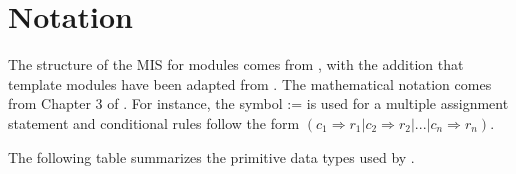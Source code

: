\documentclass[12pt, titlepage]{article}
\begin{document}
\section{Notation}


The structure of the MIS for modules comes from \citet{HoffmanAndStrooper1995},
with the addition that template modules have been adapted from
\cite{GhezziEtAl2003}.  The mathematical notation comes from Chapter 3 of
\citet{HoffmanAndStrooper1995}.  For instance, the symbol := is used for a
multiple assignment statement and conditional rules follow the form $(c_1
\Rightarrow r_1 | c_2 \Rightarrow r_2 | ... | c_n \Rightarrow r_n )$.

The following table summarizes the primitive data types used by \progname. 
\end{document}
